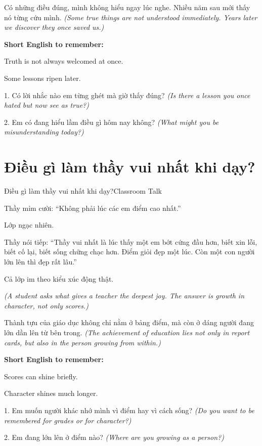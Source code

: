 \begin{baihoc}
Có những điều đúng, mình không hiểu ngay lúc nghe. Nhiều năm sau mới thấy nó từng cứu mình.
\textit{(Some true things are not understood immediately. Years later we discover they once saved us.)}
\end{baihoc}

\begin{ghinhoanh}
\textbf{Short English to remember:}

Truth is not always welcomed at once.

Some lessons ripen later.
\end{ghinhoanh}

\begin{tuhocnhanh}
1. Có lời nhắc nào em từng ghét mà giờ thấy đúng? \textit{(Is there a lesson you once hated but now see as true?)}

2. Em có đang hiểu lầm điều gì hôm nay không? \textit{(What might you be misunderstanding today?)}
\end{tuhocnhanh}
\ngancach

\section{Điều gì làm thầy vui nhất khi dạy?}
\begin{truyen}{Điều gì làm thầy vui nhất khi dạy?}{Classroom Talk}

Thầy mỉm cười: ``Không phải lúc các em điểm cao nhất.''

Lớp ngạc nhiên.

Thầy nói tiếp: ``Thầy vui nhất là lúc thấy một em bớt cứng đầu hơn, biết xin lỗi, biết cố lại, biết sống chững chạc hơn. Điểm giỏi đẹp một lúc. Còn một con người lớn lên thì đẹp rất lâu.''

Cả lớp im theo kiểu xúc động thật.

\textit{(A student asks what gives a teacher the deepest joy. The answer is growth in character, not only scores.)}
\end{truyen}

\begin{baihoc}
Thành tựu của giáo dục không chỉ nằm ở bảng điểm, mà còn ở dáng người đang lớn dần lên từ bên trong.
\textit{(The achievement of education lies not only in report cards, but also in the person growing from within.)}
\end{baihoc}

\begin{ghinhoanh}
\textbf{Short English to remember:}

Scores can shine briefly.

Character shines much longer.
\end{ghinhoanh}

\begin{tuhocnhanh}
1. Em muốn người khác nhớ mình vì điểm hay vì cách sống? \textit{(Do you want to be remembered for grades or for character?)}

2. Em đang lớn lên ở điểm nào? \textit{(Where are you growing as a person?)}
\end{tuhocnhanh}
\ngancach